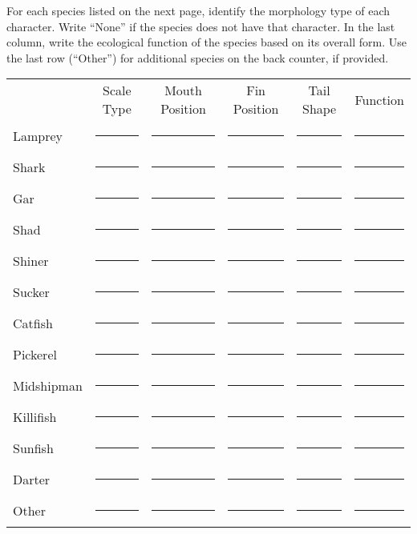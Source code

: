 \documentclass[12pt, hidelinks]{exam}
\begin{document}
\bigskip

For each species listed on the next page, identify the morphology type of each character. Write “None” if the species does not have that character.  In the last column, write the ecological function of the species based on its overall form.  Use the last row (“Other”) for additional species on the back counter, if provided.

{}
\begin{landscape}
\centering
\noindent\begin{tabular}{@{}lccccc@{}}
	&	Scale Type	&	Mouth Position	&	Fin Position	&	Tail Shape	&	Function \\[1.98em]
Lamprey	& \rule{3cm}{0.4pt} & \rule{3cm}{0.4pt} & \rule{3cm}{0.4pt} & \rule{3cm}{0.4pt} & \rule{3cm}{0.4pt} \\[1.98em]
Shark	& \rule{3cm}{0.4pt} & \rule{3cm}{0.4pt} & \rule{3cm}{0.4pt} & \rule{3cm}{0.4pt} & \rule{3cm}{0.4pt} \\[1.98em]
Gar		& \rule{3cm}{0.4pt} & \rule{3cm}{0.4pt} & \rule{3cm}{0.4pt} & \rule{3cm}{0.4pt} & \rule{3cm}{0.4pt} \\[1.98em]
Shad		& \rule{3cm}{0.4pt} & \rule{3cm}{0.4pt} & \rule{3cm}{0.4pt} & \rule{3cm}{0.4pt} & \rule{3cm}{0.4pt} \\[1.98em]
Shiner	& \rule{3cm}{0.4pt} & \rule{3cm}{0.4pt} & \rule{3cm}{0.4pt} & \rule{3cm}{0.4pt} & \rule{3cm}{0.4pt} \\[1.98em]
Sucker	& \rule{3cm}{0.4pt} & \rule{3cm}{0.4pt} & \rule{3cm}{0.4pt} & \rule{3cm}{0.4pt} & \rule{3cm}{0.4pt} \\[1.98em]
Catfish	& \rule{3cm}{0.4pt} & \rule{3cm}{0.4pt} & \rule{3cm}{0.4pt} & \rule{3cm}{0.4pt} & \rule{3cm}{0.4pt} \\[1.98em]
Pickerel	& \rule{3cm}{0.4pt} & \rule{3cm}{0.4pt} & \rule{3cm}{0.4pt} & \rule{3cm}{0.4pt} & \rule{3cm}{0.4pt} \\[1.98em]
Midshipman	& \rule{3cm}{0.4pt} & \rule{3cm}{0.4pt} & \rule{3cm}{0.4pt} & \rule{3cm}{0.4pt} & \rule{3cm}{0.4pt} \\[1.98em]
Killifish	& \rule{3cm}{0.4pt} & \rule{3cm}{0.4pt} & \rule{3cm}{0.4pt} & \rule{3cm}{0.4pt} & \rule{3cm}{0.4pt} \\[1.98em]
Sunfish	& \rule{3cm}{0.4pt} & \rule{3cm}{0.4pt} & \rule{3cm}{0.4pt} & \rule{3cm}{0.4pt} & \rule{3cm}{0.4pt} \\[1.98em]
Darter	& \rule{3cm}{0.4pt} & \rule{3cm}{0.4pt} & \rule{3cm}{0.4pt} & \rule{3cm}{0.4pt} & \rule{3cm}{0.4pt} \\[1.98em]
Other	& \rule{3cm}{0.4pt} & \rule{3cm}{0.4pt} & \rule{3cm}{0.4pt} & \rule{3cm}{0.4pt} & \rule{3cm}{0.4pt} \\
\end{tabular}
\end{landscape}
\end{document}
